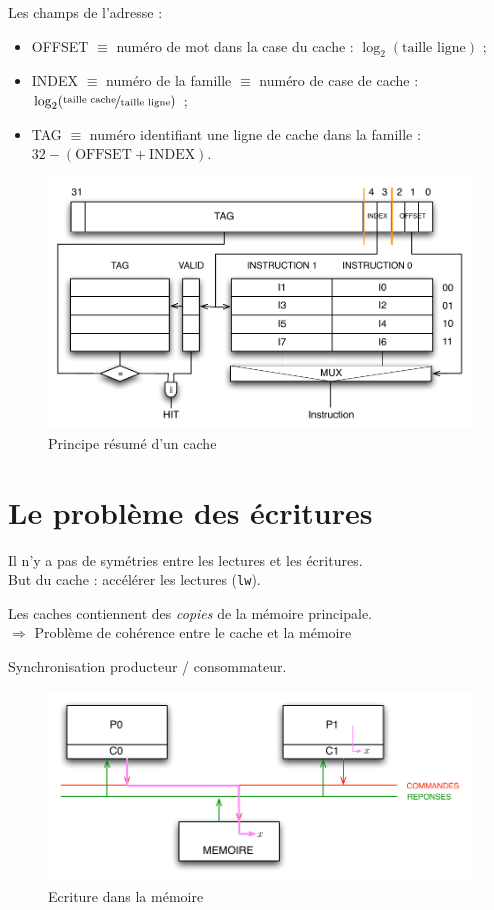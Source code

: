 \documentclass[11pt,english,french]{scrreprt}
\theoremstyle{remark}
\theoremstyle{definition}
\begin{document}
Les champs de l'adresse :\begin{itemize}
	\item OFFSET $\equiv$ numéro de mot dans la case du cache : $\log_2(\textrm{taille ligne})$ ;
	\item INDEX $\equiv$ numéro de la famille $\equiv$ numéro de case de cache : $\log_2(\nicefrac{\textrm{taille cache}}{\textrm{taille ligne}})$ ;
	\item TAG $\equiv$ numéro identifiant une ligne de cache dans la famille : $32 - (\textrm{OFFSET} + \textrm{INDEX})$.
\end{itemize}

\begin{figure}[!h]
	\center
	\includegraphics[scale=.65]{diagrammes/cache2}
	\caption{Principe résumé d'un cache}
\end{figure}

\section{Le problème des écritures} %
Il n'y a pas de symétries entre les lectures et les écritures.\\
But du cache : accélérer les lectures (\lstinline!lw!).

Les caches contiennent des \emph{copies} de la mémoire principale.\\
$\Rightarrow$ Problème de cohérence entre le cache et la mémoire

Synchronisation producteur / consommateur.

\begin{figure}[!h]
	\center
	\includegraphics[scale=.5]{diagrammes/ecriture-caches}
	\caption{Ecriture dans la mémoire}
\end{figure}
\end{document}
